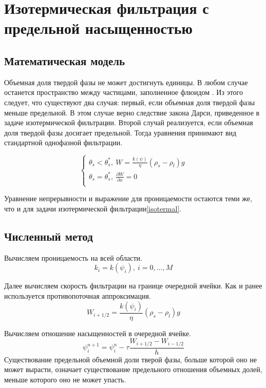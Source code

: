 \documentclass[12pt,a4paper]{article}
\newcommand{\pd}[2]{\frac{\partial #1}{\partial #2}}
\begin{document}
\section{Изотермическая фильтрация с предельной насыщенностью}
\subsection{Математическая модель}
Объемная доля твердой фазы не может достигнуть единицы. В любом случае останется пространство между частицами, заполненное флюидом \cite{Dobr_phys02}. Из этого следует, что существуют два случая: первый, если объемная доля твердой фазы меньше предельной. В этом случае верно следствие закона Дарси, приведенное в задаче изотермической фильтрации. Второй случай реализуется, если объемная доля твердой фазы досигает предельной. Тогда уравнения принимают вид стандартной однофазной фильтрации.

\begin{equation}
\begin{cases}
\theta_s < \theta_s^*,\  W = \frac{k(\psi)}{\eta} (\rho_s - \rho_l) g\\
\theta_s = \theta_s^*,\  \pd{W}{x} = 0\\
\end{cases}
\end{equation}

Уравнение непрерывности и выражение для проницаемости остаются теми же, что и для задачи изотермической фильтрации\eqref{isotermal}.

\subsection{Численный метод}
Вычисляем проницаемость на всей области.
\begin{equation}
k_i = k(\psi_i) , \ i = 0,  \dots ,M
\label{perm_razn2}
\end{equation}

Далее вычисляем скорость фильтрации на границе очередной ячейки. Как и ранее используется противопоточная аппроксимация.
\begin{equation}
W_{i+1/2} = \frac{k(\psi_i)}{\eta}(\rho_s-\rho_l)g
\label{Darsi_razn2}
\end{equation}

Вычисляем отношение насыщенностей в очередной ячейке. 
\begin{equation}
\psi_i^{n+1} = \psi_i^n - \tau\frac{W_{i+1/2} - W_{i-1/2}}{h}
\label{filtr_razn2}
\end{equation}
Существование предельной объемной доли тверой фазы, больше которой оно не может вырасти, означает существование предельного отношения объемных долей, меньше которого оно не может упасть.
\end{document}
